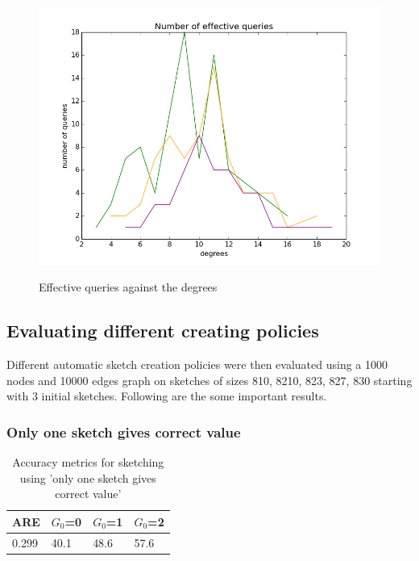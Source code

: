 \documentclass[12pt]{report}
\numberwithin{figure}{section}
\numberwithin{table}{section}
\begin{document}
\begin{figure}[H]
\centering
\includegraphics[scale=0.6]{images/deviation-plot-error-AS-2init-2scale-0t-n1000-e10000-sketches-811-821-823-827-829plot}
\label{fig:effective-queries-against-degree}
\caption{ Effective queries against the degrees }
\end{figure}

\subsection{Evaluating different creating policies}

Different automatic sketch creation policies were then evaluated using a 1000 nodes and  10000 edges graph on sketches of sizes 810, 8210, 823, 827, 830 starting with 3 initial sketches. Following are the some important results. 

\subsubsection{Only one sketch gives correct value}

\begin{table}[H]
\centering
\begin{tabular}{|l|l|l|l|}
\hline
 ARE   & $G_0$=0 & $G_0$=1 & $G_0$=2 \\ \hline
0.299 &   40.1  &   48.6  &   57.6  \\ \hline
\end{tabular}
\caption{Accuracy metrics for sketching using 'only one sketch gives correct value'}
\end{table}
\end{document}
